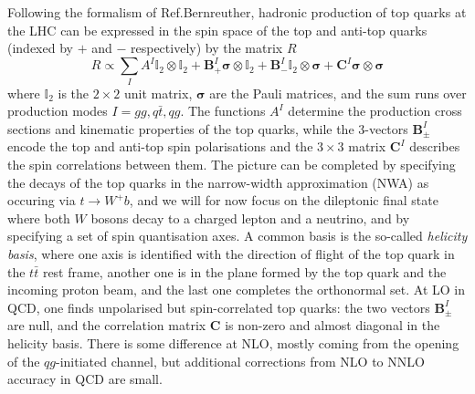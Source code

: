 \documentclass[aps,prd,twocolumn,floatfix,superscriptaddress,longbibliography,10pt]{revtex4-2}
\newcommand{\unitmat}[1]{\ensuremath{\mathbb{I}_{#1}}\xspace}
\newcommand{\ttbar}{{\ensuremath{t\bar{t}}}\xspace}
\begin{document}
Following the formalism of Ref.Bernreuther, hadronic production of top quarks at the LHC can be expressed in the spin space of the top and anti-top quarks (indexed by $+$ and $-$ respectively) by the matrix $R$
\begin{equation}\label{eq:production-matrix}
  R \propto \sum_I A^{I} \unitmat{2}\otimes\unitmat{2} + \mathbf{B}^{I}_{+}\mathbf{\sigma}\otimes\unitmat{2} + \mathbf{B}^{I}_{-}\unitmat{2}\otimes\mathbf{\sigma} + \mathbf{C}^{I}\mathbf{\sigma}\otimes\mathbf{\sigma}
\end{equation}
where $\unitmat{2}$ is the $2\times 2$ unit matrix, $\mathbf{\sigma}$ are the Pauli matrices, and the sum runs over production modes $I=gg,q\bar{t},qg$.
The functions $A^{I}$ determine the production cross sections and kinematic properties of the top quarks, while the 3-vectors $\mathbf{B}^{I}_\pm$ encode the top and anti-top spin polarisations and the $3\times 3$ matrix $\mathbf{C}^{I}$ describes the spin correlations between them.
The picture can be completed by specifying the decays of the top quarks in the narrow-width approximation (NWA) as occuring via $t\to W^+b$, and we will for now focus on the dileptonic final state where both $W$ bosons decay to a charged lepton and a neutrino, and by specifying a set of spin quantisation axes.
A common basis is the so-called \emph{helicity basis}, where one axis is identified with the direction of flight of the top quark in the \ttbar rest frame, another one is in the plane formed by the top quark and the incoming proton beam, and the last one completes the orthonormal set.
At LO in QCD, one finds unpolarised but spin-correlated top quarks: the two vectors $\mathbf{B}^{I}_\pm$ are null, and the correlation matrix $\mathbf{C}$ is non-zero and almost diagonal in the helicity basis.
There is some difference at NLO, mostly coming from the opening of the $qg$-initiated channel, but additional corrections from NLO to NNLO accuracy in QCD are small.
\end{document}
